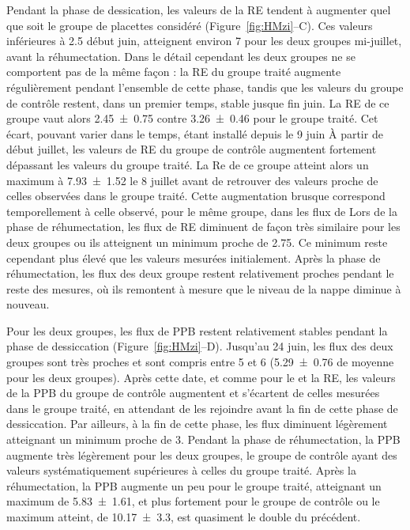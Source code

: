 Pendant la phase de dessication, les valeurs de la RE tendent à augmenter quel que soit le groupe de placettes considéré (Figure~\ref{fig:HMzi}--C).
Ces valeurs inférieures à \SI{2.5}{\uml} début juin, atteignent environ \SI{7}{\uml} pour les deux groupes mi-juillet, avant la réhumectation.
Dans le détail cependant les deux groupes ne se comportent pas de la même façon : la RE du groupe traité augmente régulièrement pendant l'ensemble de cette phase, tandis que les valeurs du groupe de contrôle restent, dans un premier temps, stable jusque fin juin.
La RE de ce groupe vaut alors \SI{2.45(075)}{\uml} contre \SI{3.26(046)}{\uml} pour le groupe traité.
Cet écart, pouvant varier dans le temps,  étant installé depuis le 9 juin
À partir de début juillet, les valeurs de RE du groupe de contrôle augmentent fortement dépassant les valeurs du groupe traité.
La Re de ce groupe atteint alors un maximum à \SI{7.93(152)}{\uml} le 8 juillet avant de retrouver des valeurs proche de celles observées dans le groupe traité.
Cette augmentation brusque correspond temporellement à celle observé, pour le même groupe, dans les flux de \chh
Lors de la phase de réhumectation, les flux de RE diminuent de façon très similaire pour les deux groupes ou ils atteignent un minimum proche de \SI{2.75}{\uml}.
Ce minimum reste cependant plus élevé que les valeurs mesurées initialement.
Après la phase de réhumectation, les flux des deux groupe restent relativement proches pendant le reste des mesures, où ils remontent à mesure que le niveau de la nappe diminue à nouveau.

Pour les deux groupes, les flux de PPB restent relativement stables pendant la phase de dessiccation (Figure~\ref{fig:HMzi}--D).
Jusqu'au 24 juin, les flux des deux groupes sont très proches et sont compris entre 5 et \SI{6}{\uml} (\SI{5.29(076)}{\uml} de moyenne pour les deux groupes).
Après cette date, et comme pour le \chh et la RE, les valeurs de la PPB du groupe de contrôle augmentent et s'écartent de celles mesurées dans le groupe traité, en attendant de les rejoindre avant la fin de cette phase de dessiccation.
Par ailleurs, à la fin de cette phase, les flux diminuent légèrement atteignant un minimum proche de \SI{3}{\uml}.
Pendant la phase de réhumectation, la PPB augmente très légèrement pour les deux groupes, le groupe de contrôle ayant des valeurs systématiquement supérieures à celles du groupe traité.
Après la réhumectation, la PPB augmente un peu pour le groupe traité, atteignant un maximum de \SI{5.83(161)}{\uml}, et plus fortement pour le groupe de contrôle ou le maximum atteint, de \SI{10.17(330)}{\uml}, est quasiment le double du précédent.


